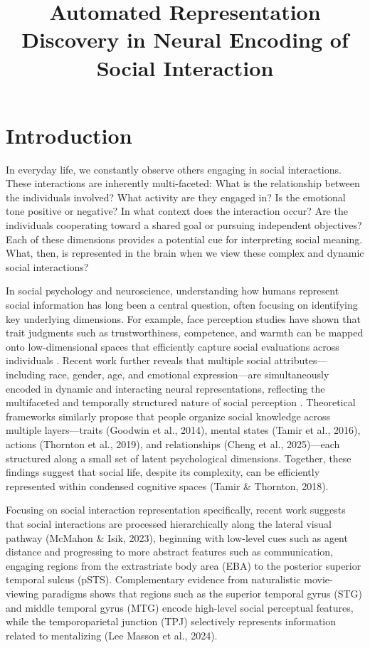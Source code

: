 \documentclass[man]{apa7}
\title{Automated Representation Discovery in Neural Encoding of Social Interaction}
\author{}
\affiliation{}
\begin{document}
\section{Introduction}

In everyday life, we constantly observe others engaging in social interactions. These interactions are inherently multi-faceted: What is the relationship between the individuals involved? What activity are they engaged in? Is the emotional tone positive or negative? In what context does the interaction occur? Are the individuals cooperating toward a shared goal or pursuing independent objectives? Each of these dimensions provides a potential cue for interpreting social meaning. What, then, is represented in the brain when we view these complex and dynamic social interactions?

In social psychology and neuroscience, understanding how humans represent social information has long been a central question, often focusing on identifying key underlying dimensions. For example, face perception studies have shown that trait judgments such as trustworthiness, competence, and warmth can be mapped onto low-dimensional spaces that efficiently capture social evaluations across individuals \cite{todorov_social_2015}. Recent work further reveals that multiple social attributes—including race, gender, age, and emotional expression—are simultaneously encoded in dynamic and interacting neural representations, reflecting the multifaceted and temporally structured nature of social perception \cite{xu_decoding_2024}. Theoretical frameworks similarly propose that people organize social knowledge across multiple layers—traits (Goodwin et al., 2014), mental states (Tamir et al., 2016), actions (Thornton et al., 2019), and relationships (Cheng et al., 2025)—each structured along a small set of latent psychological dimensions. Together, these findings suggest that social life, despite its complexity, can be efficiently represented within condensed cognitive spaces (Tamir & Thornton, 2018).

Focusing on social interaction representation specifically, recent work suggests that social interactions are processed hierarchically along the lateral visual pathway (McMahon & Isik, 2023), beginning with low-level cues such as agent distance and progressing to more abstract features such as communication, engaging regions from the extrastriate body area (EBA) to the posterior superior temporal sulcus (pSTS). Complementary evidence from naturalistic movie-viewing paradigms shows that regions such as the superior temporal gyrus (STG) and middle temporal gyrus (MTG) encode high-level social perceptual features, while the temporoparietal junction (TPJ) selectively represents information related to mentalizing (Lee Masson et al., 2024).
\end{document}
